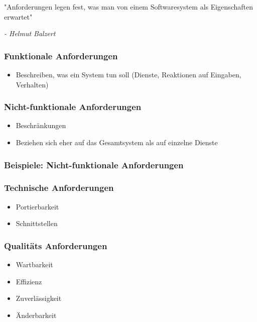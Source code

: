 \documentclass[11pt, a4paper]{article}
\begin{document}
"Anforderungen legen fest, was man von einem Softwaresystem als Eigenschaften erwartet"

\textit{- Helmut Balzert}

\subsubsection{Funktionale Anforderungen}

\begin{itemize}
    \item Beschreiben, was ein System tun soll (Dienste, Reaktionen auf Eingaben, Verhalten)
\end{itemize}

\subsubsection{Nicht-funktionale Anforderungen}

\begin{itemize}
    \item Beschränkungen
    \item Beziehen sich eher auf das Gesamtsystem als auf einzelne Dienste
\end{itemize}

\subsubsection*{Beispiele: Nicht-funktionale Anforderungen}

\subsubsection*{Technische Anforderungen}
\begin{itemize}
    \item Portierbarkeit
    \item Schnittstellen
\end{itemize}

\subsubsection*{Qualitäts Anforderungen}
\begin{itemize}
    \item Wartbarkeit
    \item Effizienz
    \item Zuverlässigkeit
    \item Änderbarkeit
\end{itemize}
\end{document}
